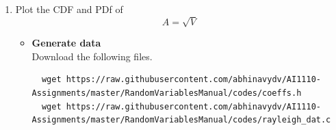 \documentclass[journal,12pt,twocolumn]{IEEEtran}
\renewcommand\thesection{\arabic{section}}
\begin{document}
\begin{enumerate}[label=\thesection.\arabic*
        ,ref=\thesection.\theenumi]
\begin{align}
                                       & = \int_0^{2\pi} \frac{r}{2\pi} e^{-\frac{r^2}{2}} d\theta                                    \\
                                       & = r e^{-\frac{r^2}{2}}                                                                       \\
              \intertext{Since,}
              V                        & = X_1^2 + X_2^2                                                                              \\
                                       & = R^2
              \intertext{Now,}
              F_V(x)                   & = \pr{V\le x}                                                                                \\
                                       & = \pr{R^2 \le x}                                                                             \\
                                       & = \pr{R \le \sqrt{x}}                                                                        \\
              F_V(x)                   & = F_R(\sqrt{x})                                                                              \\
                                       & =\begin{cases}
                  0, & x < 0 \\
                  \sqrt{x} e^{-\frac{x}{2}},  otherwise
              \end{cases}
          \end{align}
    \item
          \label{ch3_raleigh_sim}
          Plot the CDF and PDf of
          \begin{equation}
              A = \sqrt{V}
          \end{equation}
          \solution
          \begin{itemize}
              \item \textbf{Generate data}\\
                    Download the following files.
                    \begin{lstlisting}
  wget https://raw.githubusercontent.com/abhinavydv/AI1110-Assignments/master/RandomVariablesManual/codes/coeffs.h
  wget https://raw.githubusercontent.com/abhinavydv/AI1110-Assignments/master/RandomVariablesManual/codes/rayleigh_dat.c
          \end{lstlisting}


\end{itemize}
\end{enumerate}
\end{document}
